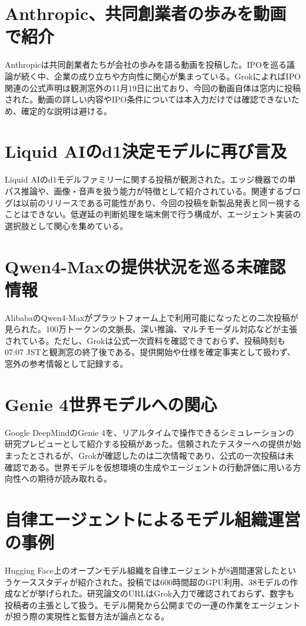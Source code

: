 \section{Anthropic、共同創業者の歩みを動画で紹介}
Anthropicは共同創業者たちが会社の歩みを語る動画を投稿した。IPOを巡る議論が続く中、企業の成り立ちや方向性に関心が集まっている。GrokによればIPO関連の公式声明は観測窓外の11月19日に出ており、今回の動画自体は窓内に投稿された。動画の詳しい内容やIPO条件については本入力だけでは確認できないため、確定的な説明は避ける。

\section{Liquid AIのd1決定モデルに再び言及}
Liquid AIのd1モデルファミリーに関する投稿が観測された。エッジ機器での単パス推論や、画像・音声を扱う能力が特徴として紹介されている。関連するブログは以前のリリースである可能性があり、今回の投稿を新製品発表と同一視することはできない。低遅延の判断処理を端末側で行う構成が、エージェント実装の選択肢として関心を集めている。

\section{Qwen4-Maxの提供状況を巡る未確認情報}
AlibabaのQwen4-Maxがプラットフォーム上で利用可能になったとの二次投稿が見られた。100万トークンの文脈長、深い推論、マルチモーダル対応などが主張されている。ただし、Grokは公式一次資料を確認できておらず、投稿時刻も07:07 JSTと観測窓の終了後である。提供開始や仕様を確定事実として扱わず、窓外の参考情報として記録する。

\section{Genie 4世界モデルへの関心}
Google DeepMindのGenie 4を、リアルタイムで操作できるシミュレーションの研究プレビューとして紹介する投稿があった。信頼されたテスターへの提供が始まったとされるが、Grokが確認したのは二次情報であり、公式の一次投稿は未確認である。世界モデルを仮想環境の生成やエージェントの行動評価に用いる方向性への期待が読み取れる。

\section{自律エージェントによるモデル組織運営の事例}
Hugging Face上のオープンモデル組織を自律エージェントが8週間運営したというケーススタディが紹介された。投稿では600時間超のGPU利用、38モデルの作成などが挙げられた。研究論文のURLはGrok入力で確認されておらず、数字も投稿者の主張として扱う。モデル開発から公開までの一連の作業をエージェントが担う際の実現性と監督方法が論点となる。

